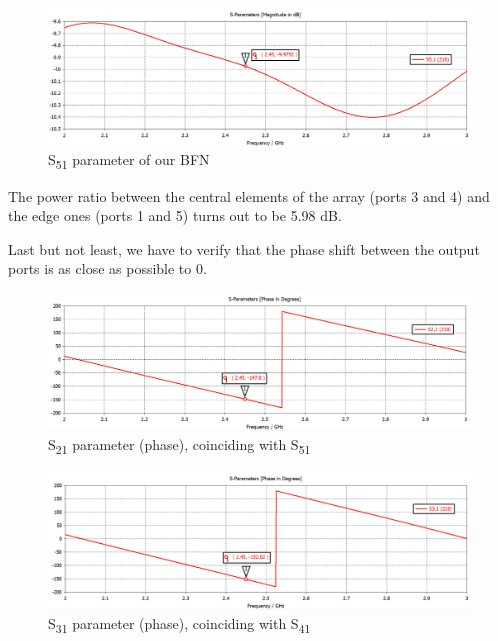 \begin{figure}[H]
\centering
\includegraphics[scale=0.35]{S51Amp.png}
\caption{S\textsubscript{51} parameter of our BFN}
\label{S51Amp}
\end{figure}

\par\medskip
\noindent
The power ratio between the central elements of the array (ports 3 and 4) and the edge ones (ports 1 and 5) turns out to be 5.98 dB.

\par\medskip
\noindent
Last but not least, we have to verify that the phase shift between the output ports is as close as possible to 0.

\begin{figure}[H]
\centering
\includegraphics[scale=0.35]{S21p.png}
\caption{S\textsubscript{21} parameter (phase), coinciding with S\textsubscript{51}}
\label{S21phase}
\end{figure}

\begin{figure}[H]
\centering
\includegraphics[scale=0.35]{S31p.png}
\caption{S\textsubscript{31} parameter (phase), coinciding with S\textsubscript{41}}
\label{S31phase}
\end{figure}

